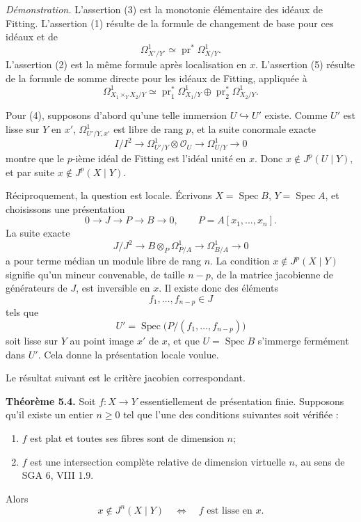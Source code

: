 \documentclass[11pt]{article}
\providecommand{\Spec}{\operatorname{Spec}}
\providecommand{\pr}{\operatorname{pr}}
\providecommand{\Oo}{\mathcal O}
\begin{document}
\emph{Démonstration.}  L'assertion (3) est la monotonie élémentaire des idéaux de Fitting.  L'assertion (1) résulte de la formule de changement de base pour ces idéaux et de
\[
        \Omega^1_{X'/Y'}\simeq \pr^*\Omega^1_{X/Y}.
\]
L'assertion (2) est la même formule après localisation en \(x\).  L'assertion (5) résulte de la formule de somme directe pour les idéaux de Fitting, appliquée à
\[
        \Omega^1_{X_1\times_YX_2/Y}
        \simeq
        \pr_1^*\Omega^1_{X_1/Y}\oplus
        \pr_2^*\Omega^1_{X_2/Y}.
\]

Pour (4), supposons d'abord qu'une telle immersion \(U\hookrightarrow U'\) existe.  Comme \(U'\) est lisse sur \(Y\) en \(x'\), \(\Omega^1_{U'/Y,x'}\) est libre de rang \(p\), et la suite conormale exacte
\[
        I/I^2\longrightarrow
        \Omega^1_{U'/Y}\otimes\Oo_U\longrightarrow
        \Omega^1_{U/Y}\longrightarrow 0
\]
montre que le \(p\)-ième idéal de Fitting est l'idéal unité en \(x\).  Donc \(x\notin J^p(U\mid Y)\), et par suite \(x\notin J^p(X\mid Y)\).

Réciproquement, la question est locale.  Écrivons \(X=\Spec B\), \(Y=\Spec A\), et choisissons une présentation
\[
        0\longrightarrow J\longrightarrow P\longrightarrow B\longrightarrow 0,
        \qquad
        P=A[x_1,\ldots,x_n].
\]
La suite exacte
\[
        J/J^2\longrightarrow B\otimes_P\Omega^1_{P/A}
        \longrightarrow \Omega^1_{B/A}\longrightarrow 0
\]
a pour terme médian un module libre de rang \(n\).  La condition \(x\notin J^p(X\mid Y)\) signifie qu'un mineur convenable, de taille \(n-p\), de la matrice jacobienne de générateurs de \(J\), est inversible en \(x\).  Il existe donc des éléments
\[
        f_1,\ldots,f_{n-p}\in J
\]
tels que
\[
        U'=\Spec\bigl(P/(f_1,\ldots,f_{n-p})\bigr)
\]
soit lisse sur \(Y\) au point image \(x'\) de \(x\), et que \(U=\Spec B\) s'immerge fermément dans \(U'\).  Cela donne la présentation locale voulue.

Le résultat suivant est le critère jacobien correspondant.

\textbf{Théorème 5.4.}  Soit \(f:X\to Y\) essentiellement de présentation finie.  Supposons qu'il existe un entier \(n\geq 0\) tel que l'une des conditions suivantes soit vérifiée :
\begin{enumerate}[label=(\arabic*)]
\item \(f\) est plat et toutes ses fibres sont de dimension \(n\);
\item \(f\) est une intersection complète relative de dimension virtuelle \(n\), au sens de SGA 6, VIII 1.9.
\end{enumerate}
Alors
\[
        x\notin J^n(X\mid Y)
        \quad\Longleftrightarrow\quad
        f\text{ est lisse en }x.
\]
\end{document}
